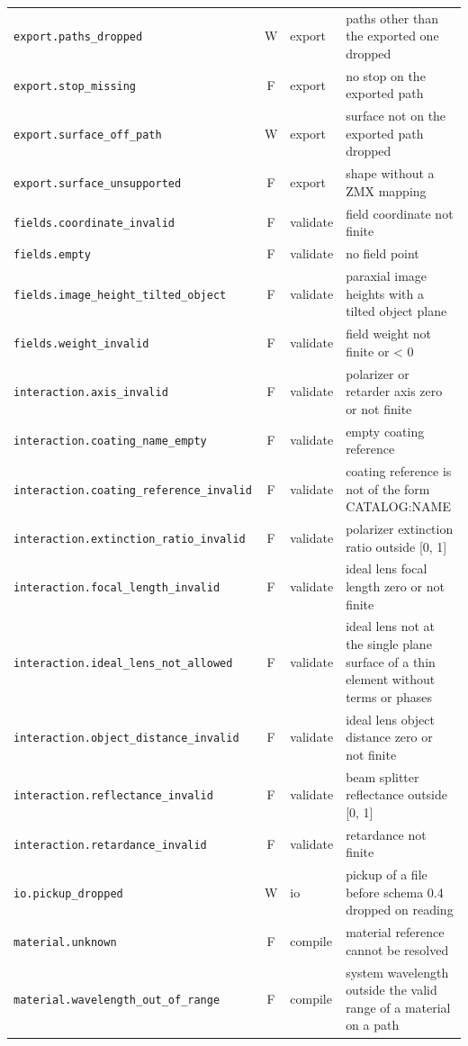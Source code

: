 \documentclass[11pt,a4paper,openany]{book}
\begin{document}
{\begin{longtable}{@{}L{6.1cm}cL{1.3cm}L{6.9cm}@{}}
\texttt{export.paths\_dropped} & W & export & paths other than the exported one dropped \\
\texttt{export.stop\_missing} & F & export & no stop on the exported path \\
\texttt{export.surface\_off\_path} & W & export & surface not on the exported path dropped \\
\texttt{export.surface\_unsupported} & F & export & shape without a ZMX mapping \\
\texttt{fields.coordinate\_invalid} & F & validate & field coordinate not finite \\
\texttt{fields.empty} & F & validate & no field point \\
\texttt{fields.image\_height\_tilted\_object} & F & validate & paraxial image heights with a tilted object plane \\
\texttt{fields.weight\_invalid} & F & validate & field weight not finite or < 0 \\
\texttt{interaction.axis\_invalid} & F & validate & polarizer or retarder axis zero or not finite \\
\texttt{interaction.coating\_name\_empty} & F & validate & empty coating reference \\
\texttt{interaction.coating\_reference\_invalid} & F & validate & coating reference is not of the form CATALOG:NAME \\
\texttt{interaction.extinction\_ratio\_invalid} & F & validate & polarizer extinction ratio outside [0, 1] \\
\texttt{interaction.focal\_length\_invalid} & F & validate & ideal lens focal length zero or not finite \\
\texttt{interaction.ideal\_lens\_not\_allowed} & F & validate & ideal lens not at the single plane surface of a thin element without terms or phases \\
\texttt{interaction.object\_distance\_invalid} & F & validate & ideal lens object distance zero or not finite \\
\texttt{interaction.reflectance\_invalid} & F & validate & beam splitter reflectance outside [0, 1] \\
\texttt{interaction.retardance\_invalid} & F & validate & retardance not finite \\
\texttt{io.pickup\_dropped} & W & io & pickup of a file before schema 0.4 dropped on reading \\
\texttt{material.unknown} & F & compile & material reference cannot be resolved \\
\texttt{material.wavelength\_out\_of\_range} & F & compile & system wavelength outside the valid range of a material on a path \\

\end{longtable}}
\end{document}
